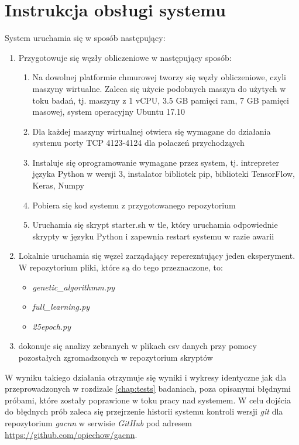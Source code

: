 \chapter[Dodatek C]{Instrukcja obsługi systemu}

System uruchamia się w sposób następujący:
\begin{enumerate}
  \item Przygotowuje się węzły obliczeniowe w następujący sposób:
  \begin{enumerate}
    \item Na dowolnej platformie chmurowej tworzy się węzły obliczeniowe, czyli maszyny wirtualne.
    Zaleca się użycie podobnych maszyn do użytych w toku badań, tj. maszyny z 1 vCPU, 3.5 GB pamięci ram, 7 GB pamięci masowej, system operacyjny Ubuntu 17.10
    \item Dla każdej maszyny wirtualnej otwiera się wymagane do działania systemu porty TCP 4123-4124 dla połaczeń przychodząych
    \item Instaluje się oprogramowanie wymagane przez system, tj. intrepreter języka Python w wersji 3, instalator bibliotek pip, biblioteki TensorFlow, Keras, Numpy
    \item Pobiera się kod systemu z przygotowanego repozytorium
    \item Uruchamia się skrypt starter.sh w tle, który uruchamia odpowiednie skrypty w języku Python i zapewnia restart systemu w razie awarii
  \end{enumerate}
  \item Lokalnie uruchamia się węzeł zarządający reperezntujący jeden eksperyment.
  W repozytorium pliki, które są do tego przeznaczone, to:
  \begin{itemize}
    \item \textit{genetic\_algorithmm.py}
    \item \textit{full\_learning.py}
    \item \textit{25epoch.py}
  \end{itemize}
  \item dokonuje się analizy zebranych w plikach csv danych przy pomocy pozostałych zgromadzonych w repozytorium skryptów
\end{enumerate}
W wyniku takiego działania otrzymuje się wyniki i wykresy identyczne jak dla przeprowadzonych w rozdizale \ref{chap:tests} badaniach, poza opisanymi błędnymi próbami, które zostały poprawione w toku pracy nad systemem.
W celu dojścia do błędnych prób zaleca się przejrzenie historii systemu kontroli wersji \textit{git} dla repozytorium \textit{gacnn} w serwisie \textit{GitHub} pod adresem \url{https://github.com/opiechow/gacnn}.
